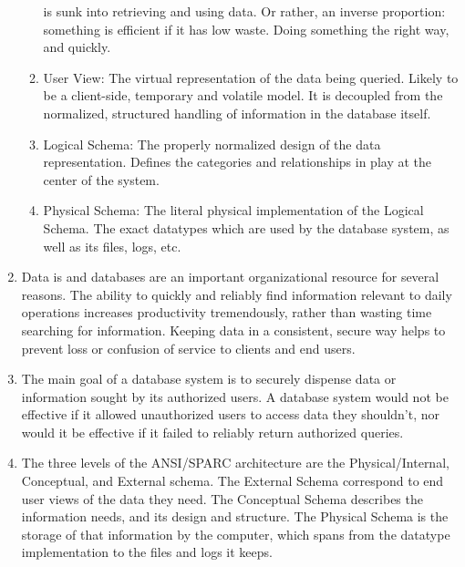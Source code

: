 \documentclass{article}
\begin{document}
\begin{enumerate}
\begin{enumerate}
		is sunk into retrieving and using data. Or rather, an inverse
		proportion: something is efficient if it has low waste. Doing
		something the right way, and quickly.
	\item User View: The virtual representation of the data being queried.
		Likely to be a client-side, temporary and volatile model. It is
		decoupled from the normalized, structured handling of
		information in the database itself.
	\item Logical Schema: The properly normalized design of the data
		representation. Defines the categories and relationships in
		play at the center of the system.
	\item Physical Schema: The literal physical implementation of the
		Logical Schema. The exact datatypes which are used by the
		database system, as well as its files, logs, etc.

\end{enumerate}

\item Data is and databases are an important organizational resource for several
reasons. The ability to quickly and reliably find information relevant to daily
operations increases productivity tremendously, rather than wasting time
searching for information. Keeping data in a consistent,
secure way helps to prevent loss or confusion of service to clients and end
users.

\item The main goal of a database system is to securely dispense data or information sought
by its authorized users. A database system would not be effective if it allowed
unauthorized users to access data they shouldn't, nor would it be effective if it failed to reliably return authorized queries.

\item The three levels of the ANSI/SPARC architecture are the Physical/Internal,
Conceptual, and External schema. The External Schema correspond to end user
views of the data they need. The Conceptual Schema describes the information
needs, and its design and structure. The Physical Schema is the storage of that
information by the computer, which spans from the datatype implementation to
the files and logs it keeps.

\end{enumerate}
\end{document}
